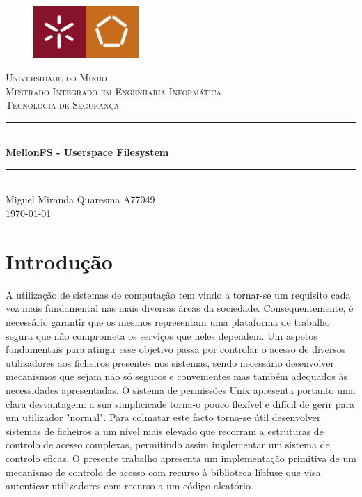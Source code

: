 \documentclass{article}
\newcommand{\titleRule}{
    \rule{\linewidth}{0.5mm} \\ [0.25cm]
}
\begin{document}
\begin{titlepage}
    \center
    \begin{figure}[H]
        \centering
        \includegraphics[width=4cm]{Pictures/UM_EENG.jpg}
    \end{figure}
    \textsc{\LARGE Universidade do Minho} \\ [1.5cm]
    \textsc{\Large Mestrado Integrado em Engenharia Informática} \\ [0.5cm]
    \textsc{\large Tecnologia de Segurança} \\ [0.5cm]

    \titleRule
    {\huge \bfseries MellonFS - Userspace Filesystem}
    \titleRule

    Miguel Miranda Quaresma A77049 \\[0.25cm]

    \today
\end{titlepage}

\newpage

\tableofcontents

\newpage

\section{Introdução}
A utilização de sistemas de computação tem vindo a tornar-se um requisito cada vez mais fundamental nas mais diversas áreas da sociedade. Consequentemente, é 
necessário garantir que os mesmos representam uma plataforma de trabalho segura que não comprometa os serviços que neles dependem. Um aspetos fundamentais para 
atingir esse objetivo passa por controlar o acesso de diversos utilizadores aos ficheiros presentes nos sistemas, sendo necessário desenvolver mecanismos que 
sejam não só seguros e convenientes mas também adequados às necessidades apresentadas.
O sistema de permissões Unix apresenta portanto uma clara desvantagem: a sua simplicicade torna-o pouco flexível e difícil de gerir para um utilizador "normal". 
Para colmatar este facto torna-se útil desenvolver sistemas de ficheiros a um nível mais elevado que recorram a estruturas de controlo de acesso complexas, 
permitindo assim implementar um sistema de controlo eficaz. O presente trabalho apresenta um implementação primitiva de um mecanismo de controlo de acesso com 
recurso à biblioteca libfuse que visa autenticar utilizadores com recurso a um código aleatório.
\end{document}
